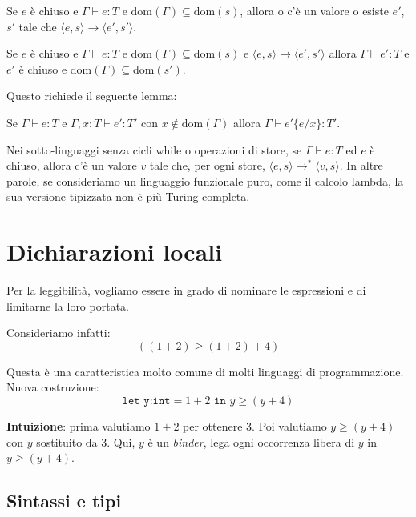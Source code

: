 \begin{theorem}[Progress]
Se $e$ è chiuso e $\Gamma \vdash e : T$ e $\text{dom}(\Gamma)
\subseteq \text{dom}(s)$, allora o c'è un valore o esiste $e'$, $s'$
tale che $\langle e,s \rangle \rightarrow \langle e',s' \rangle$.
\end{theorem}

\begin{theorem}
Se $e$ è chiuso e $\Gamma \vdash e : T$ e $\text{dom}(\Gamma)
\subseteq \text{dom}(s)$ e $\langle e,s \rangle \rightarrow
\langle e',s' \rangle$ allora $\Gamma \vdash e' : T$ e $e'$ è
chiuso e $\text{dom}(\Gamma) \subseteq \text{dom}(s')$.
\end{theorem}

Questo richiede il seguente lemma:

\begin{lemma}[Sostituzione]
Se $\Gamma \vdash e : T$ e $\Gamma,x : T \vdash e' : T'$ con
$x \notin \text{dom}(\Gamma)$ allora $\Gamma \vdash e'\{e/x\} : T'$.
\end{lemma}

\begin{theorem}[Normalizzazione]
Nei sotto-linguaggi senza cicli while o operazioni di store,
se $\Gamma \vdash e : T$ ed $e$ è chiuso, allora c'è un valore $v$
tale che, per ogni store, $\langle e,s \rangle \rightarrow^* \langle
v,s \rangle$. In altre parole, se consideriamo un linguaggio funzionale
puro, come il calcolo lambda, la sua versione tipizzata non è più Turing-completa.
\end{theorem}
\section{Dichiarazioni locali}
Per la leggibilità, vogliamo essere in grado di nominare le
espressioni e di limitarne la loro portata.

Consideriamo infatti: 
\[((1+2) \geq (1+2)+4)\]

Questa è una caratteristica molto comune di molti linguaggi di programmazione.
Nuova costruzione: 
\[\texttt{let y:int} = 1+2 \texttt{ in } y \geq (y+4)\]

\textbf{Intuizione}: prima valutiamo $1+2$ per ottenere $3$.
Poi valutiamo $y \geq (y+4)$ con $y$ sostituito da $3$.
Qui, $y$ è un \textit{binder}, lega ogni occorrenza libera di $y$ in $y \geq (y+4)$.
\subsection{Sintassi e tipi}

